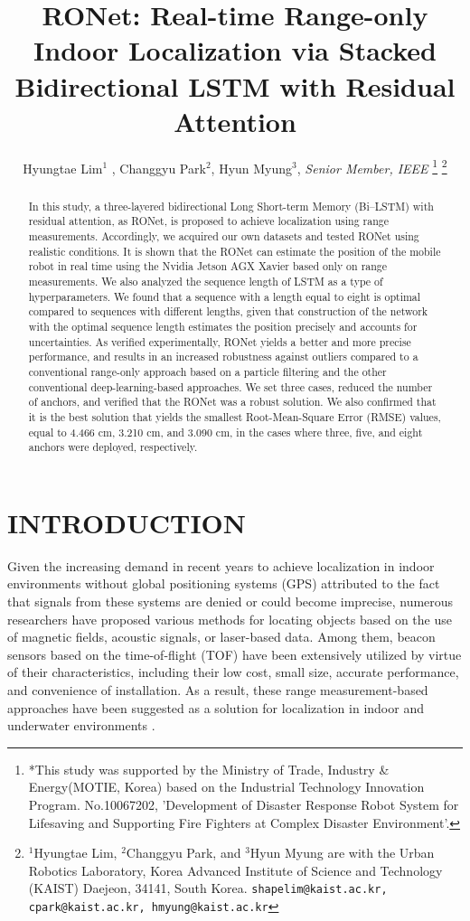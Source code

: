 \documentclass[letterpaper, 10 pt, conference]{ieeeconf}
\title{\LARGE \bf
RONet: Real-time Range-only Indoor Localization via Stacked Bidirectional LSTM with Residual Attention}
\author{Hyungtae Lim$^{1}$ , Changgyu Park$^{2}$, Hyun Myung$^{3}$, \textit{Senior Member, IEEE}%
\thanks{
	*This study was supported by the Ministry of Trade, Industry \& Energy(MOTIE, Korea) based on the Industrial Technology Innovation Program. No.10067202, 'Development of Disaster Response Robot System for Lifesaving and Supporting Fire Fighters at Complex Disaster Environment'.}%
\thanks{$^{1}$Hyungtae Lim, $^{2}$Changgyu Park, and $^{3}$Hyun Myung are with
	the Urban Robotics Laboratory, Korea Advanced Institute of Science
	and Technology (KAIST) Daejeon, 34141, South Korea. {\tt\small shapelim@kaist.ac.kr, cpark@kaist.ac.kr, hmyung@kaist.ac.kr}}%
%
}
\begin{document}

\maketitle
\thispagestyle{empty}
\pagestyle{empty}


\begin{abstract}

In this study, a three-layered bidirectional Long Short-term Memory (Bi--LSTM) with residual attention, as RONet, is proposed to achieve localization using range measurements. Accordingly, we acquired our own datasets and tested RONet using realistic conditions. It is shown that the RONet can estimate the position of the mobile robot in real time using the Nvidia Jetson AGX Xavier based only on range measurements. We also analyzed the sequence length of LSTM as a type of hyperparameters. We found that a sequence with a length equal to eight is optimal compared to sequences with different lengths, given that construction of the network with the optimal sequence length estimates the position precisely and accounts for uncertainties. As verified experimentally, RONet yields a better and more precise performance, and results in an increased robustness against outliers compared to a conventional range-only approach based on a particle filtering and the other conventional deep-learning-based approaches. We set three cases, reduced the number of anchors, and verified that the RONet was a robust solution. We also confirmed that it is the best solution that yields the smallest Root-Mean-Square Error (RMSE) values, equal to 4.466 cm, 3.210 cm, and 3.090 cm, in the cases where three, five, and eight anchors were deployed, respectively.   

\end{abstract}

\section{INTRODUCTION}

Given the increasing demand in recent years to achieve localization in indoor environments without global positioning systems (GPS) attributed to the fact that signals from these systems are denied or could become imprecise, numerous researchers have proposed various methods for locating objects based on the use of magnetic fields, acoustic signals, or laser-based data\cite{jung2015magnetic,medina2013ultrasound,li2014lidar}. Among them, beacon sensors based on the time-of-flight (TOF) have been extensively utilized by virtue of their characteristics, including their low cost, small size, accurate performance, and convenience of installation. As a result, these range measurement-based approaches have been suggested as a solution for localization in indoor \cite{peneda2009trilateration,jung2011indoor} and underwater environments \cite{newman2003pure, olson2006robust}.
\end{document}
